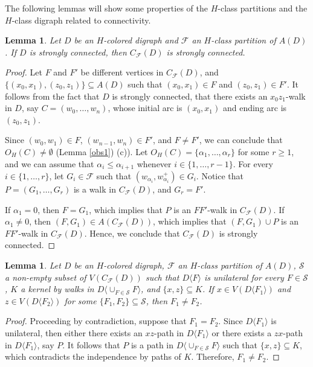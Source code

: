 \documentclass[10pt,a4paper]{article}
\newtheorem{lemma}[theorem]{Lemma}
\begin{document}
The following lemmas will show some properties of the $H$-class partitions and the $H$-class digraph related to connectivity.

\begin{lemma}
\label{c1.l2}
Let $D$ be an $H$-colored digraph and $\mathscr{F}$ an $H$-class partition of $A(D)$. If $D$ is strongly connected, then $C_{\mathscr{F}}(D)$ is strongly connected.
\end{lemma}
\begin{proof}
Let $F$ and $F'$ be different vertices in $C_{\mathscr{F}}(D)$, and $\{ (x_{0}, x_{1} ), (z_{0},z_{1})\} \subseteq A(D)$ such that $(x_{0}, x_{1}) \in F$ and $(z_{0}, z_{1}) \in F'$. It follows from the fact that $D$ is strongly connected, that there exists an $x_{0}z_{1}$-walk in $D$, say $C=(w_{0}, \ldots , w_{n})$, whose initial arc is $(x_{0}, x_{1})$ and ending arc is $(z_{0}, z_{1})$.

Since $(w_{0}, w_{1}) \in F$, $(w_{n-1}, w_{n}) \in F'$, and $F \neq F'$, we can conclude that $O_{H}(C) \neq \emptyset$ (Lemma \ref{obs1}) (c)). Let $O_{H}(C)=\{ \alpha_{1}, \ldots , \alpha_{r} \}$ for some $r \geq 1$, and we can assume that $\alpha_{i} \leq \alpha_{i+1}$ whenever  $i \in \{ 1, \ldots , r-1 \}$. For every $i \in \{ 1, \ldots , r \}$, let $G_{i} \in \mathscr{F}$ such that $(w_{\alpha_{i}}, w_{\alpha_{i}}^{+}) \in G_{i}$. Notice that $P=(G_{1}, \ldots , G_{r})$ is a walk in $C_{\mathscr{F}}(D)$, and $G_{r}=F'$.

 If $\alpha_{1}=0$, then $F=G_{1}$, which implies that $P$ is an $FF'$-walk in $C_{\mathscr{F}}(D)$. If $\alpha_{1}\neq 0$, then $(F, G_{1})\in A(C_{\mathscr{F}}(D))$, which implies that $(F, G_{1}) \cup P$ is an $FF'$-walk in $C_{\mathscr{F}}(D)$. Hence, we conclude that $C_{\mathscr{F}}(D)$ is strongly connected.
\end{proof}

\begin{lemma}
\label{unilateral.lema}
Let $D$ be an $H$-colored digraph, $\mathscr{F}$ an $H$-class partition of $A(D)$,  $\mathcal{S}$ a non-empty subset of $V(C_{\mathscr{F}}(D))$ such that $D\langle F \rangle$ is unilateral for every $F\in \mathcal{S}$, $K$ a kernel by walks in $D\langle \cup_{F\in \mathcal{S}} F \rangle$, and $\{x,z\} \subseteq K$. If  $x \in V(D\langle F_{1} \rangle )$  and $z \in V(D \langle F_{2} \rangle)$ for some $\{F_{1}, F_{2}\} \subseteq \mathcal{S}$, then $F_{1} \neq F_{2}$.
\end{lemma}
\begin{proof}
Proceeding by contradiction, suppose that $F_{1} = F_{2}$. Since $D\langle F_{1} \rangle$ is unilateral, then either there exists an $xz$-path in $D \langle F_{1} \rangle$ or there exists a $zx$-path in $D\langle F_{1} \rangle$, say $P$. It follows that $P$ is a path in $D\langle \cup_{F\in \mathcal{S}} F \rangle$ such that $\{x,z\} \subseteq K$, which contradicts the independence by paths of $K$. Therefore, $F_{1} \neq F_{2}$.
\end{proof}
\end{document}
